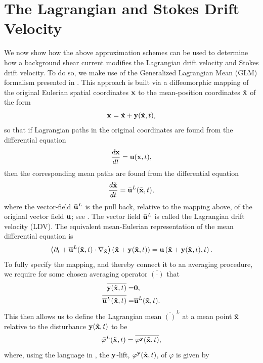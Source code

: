 \documentclass{JFM_Style/jfm}
\newcommand{\pd}{\partial}
\begin{document}
\section{The Lagrangian and Stokes Drift Velocity}
We now show how the above approximation schemes can be used to determine how a background shear current modifies the Lagrangian drift velocity  and Stokes drift velocity.  To do so, we make use of the Generalized Lagrangian Mean (GLM) formalism presented in \cite{andrews}.  This approach is built via a diffeomorphic mapping of the original Eulerian spatial coordinates ${\bf x}$ to the mean-position coordinates $\tilde{\bf x}$ of the form
\[
{\bf x} = \tilde{{\bf x}} + {\bf y}(\tilde{{\bf x}},t),
\]
so that if Lagrangian paths in the original coordinates are found from the differential equation
\[
\frac{d{\bf x}}{dt} = {\bf u}({\bf x},t),
\]
then the corresponding mean paths are found from the differential equation
\begin{equation}
\frac{d\tilde{{\bf x}}}{dt} = \bar{{\bf u}}^{L}(\tilde{{\bf x}},t),
\label{meanode}
\end{equation}
where the vector-field $\bar{{\bf u}}^{L}$ is the pull back, relative to the mapping above, of the original vector field ${\bf u}$; see \cite{buhler}.  The vector field $\bar{{\bf u}}^{L}$ is called the Lagrangian drift velocity (LDV).  The equivalent mean-Eulerian representation of the mean differential equation is 
\begin{equation}
\left(\pd_{t} + \overline{{\bf u}}^{L}(\tilde{{\bf x}},t)\cdot \nabla_{\tilde{{\bf x}}} \right) \left(\tilde{{\bf x}} + {\bf y}(\tilde{{\bf x}},t)\right) = {\bf u}\left(\tilde{{\bf x}} + {\bf y}(\tilde{{\bf x}},t),t\right).
\label{speeddef}
\end{equation}
To fully specify the mapping, and thereby connect it to an averaging procedure, we require for some chosen averaging operator $\bar{(\cdot)}$ that 
\begin{align*}
\overline{{\bf y}(\tilde{{\bf x}},t)} = & \bf{0}, \\
\overline{\overline{{\bf u}}^{L}(\tilde{{\bf x}},t)} = & \overline{{\bf u}}^{L}(\tilde{{\bf x}},t).
\end{align*}
This then allows us to define the Lagrangian mean $\bar{()}^{L}$ at a mean point $\tilde{{\bf x}}$ relative to the disturbance ${\bf y}(\tilde{{\bf x}},t)$ to be
\[
\bar{\varphi}^{L}(\tilde{{\bf x}},t) = \overline{\varphi^{\bf y}(\tilde{{\bf x}},t)}, 
\]
where, using the language in \cite{buhler}, the ${\bf y}$-lift, $\varphi^{\bf y}(\tilde{{\bf x}},t)$, of $\varphi$ is given by 
\end{document}
